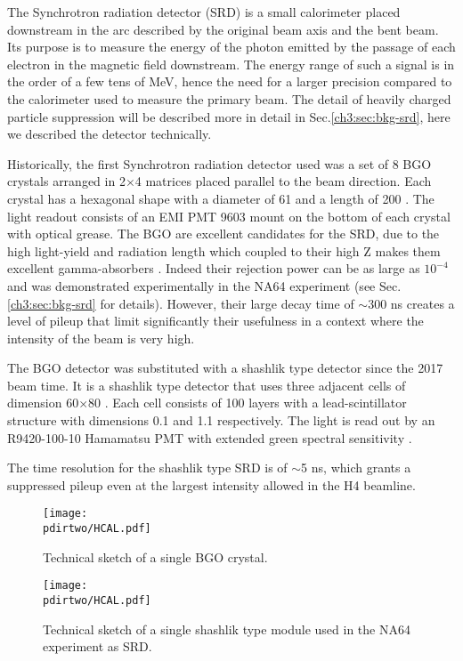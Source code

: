 The Synchrotron radiation detector (SRD) is a small calorimeter placed downstream in the arc described by the original beam axis and the bent beam. Its purpose is to measure the energy of the photon emitted by the passage of each electron in the magnetic field downstream. The energy range of such a signal is in the order of a few tens of MeV, hence the need for a larger precision compared to the calorimeter used to measure the primary beam. The detail of heavily charged particle suppression will be described more in detail in Sec.\ref{ch3:sec:bkg-srd}, here we described the detector technically.

Historically, the first Synchrotron radiation detector used was a set of 8 BGO crystals arranged in 2$\times$4 matrices placed parallel to the beam direction. Each crystal has a hexagonal shape with a diameter of 61 \mmi and a length of 200 \mmi. The light readout consists of an EMI PMT 9603 mount on the bottom of each crystal with optical grease. The BGO are excellent candidates for the SRD, due to the high light-yield and radiation length which coupled to their high Z makes them excellent gamma-absorbers \cite{bgo-crystal}. Indeed their rejection power can be as large as $10^{-4}$ and was demonstrated experimentally in the NA64 experiment (see Sec.\ref{ch3:sec:bkg-srd} for details). However, their large decay time of $\sim$300 \si{ns} creates a level of pileup that limit significantly their usefulness in a context where the intensity of the beam is very high.

The BGO detector was substituted with a shashlik type detector since the 2017 beam time. It is a shashlik type detector that uses three adjacent cells of dimension 60$\times$80 \mmi. Each cell consists of 100 layers with a lead-scintillator structure with dimensions 0.1 \mmi and 1.1 \mmi respectively. The light is read out by an R9420-100-10 Hamamatsu PMT with extended green spectral sensitivity \cite{hamamatsu-R9420-100-10}.

The time resolution for the shashlik type SRD is of $\sim$5 \si{ns}, which grants a suppressed pileup even at the largest intensity allowed in the H4 beamline.

\begin{figure}[bth!]
\centering
\texttt{[image: \\pdirtwo/HCAL.pdf]}
\caption[BGO sketch]{Technical sketch of a single BGO crystal.}
\label{fig:bgo-sketch}
\end{figure}

\begin{figure}[bth!]
\centering
\texttt{[image: \\pdirtwo/HCAL.pdf]}
\caption[SRD sketch]{Technical sketch of a single shashlik type module used in the NA64 experiment as SRD.}
\label{fig:srd-sketch}
\end{figure}

